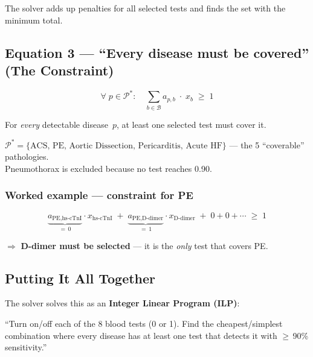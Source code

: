 \documentclass[11pt,a4paper]{article}
\begin{document}
The solver adds up penalties for all selected tests and finds the set with the
minimum total.


\subsection{Equation 3 --- ``Every disease must be covered'' (The Constraint)}

\begin{equation}
\forall\; p \in \mathcal{P}^{*} :\quad
\sum_{b \in \mathcal{B}} a_{p,b} \;\cdot\; x_b \;\geq\; 1
\tag{Coverage}
\end{equation}

\begin{tcolorbox}[insightbox, title={Plain English}]
For \emph{every} detectable disease~$p$, at least one selected test must cover it.
\end{tcolorbox}

$\mathcal{P}^{*} = \{\text{ACS, PE, Aortic Dissection, Pericarditis, Acute HF}\}$
--- the 5 ``coverable'' pathologies.\\
Pneumothorax is excluded because no test reaches 0.90.

\subsubsection*{Worked example --- constraint for PE}

\[
\underbrace{a_{\text{PE,hs-cTnI}}}_{=\,0}\!\cdot x_{\text{hs-cTnI}}
\;+\;
\underbrace{a_{\text{PE,D-dimer}}}_{=\,1}\!\cdot x_{\text{D-dimer}}
\;+\; 0 + 0 + \cdots \;\geq\; 1
\]

$\Rightarrow$ \textbf{D-dimer must be selected} --- it is the \emph{only} test
that covers PE.


\subsection{Putting It All Together}

The solver solves this as an \textbf{Integer Linear Program (ILP)}:

\begin{tcolorbox}[insightbox, title={One-line summary}]
``Turn on/off each of the 8 blood tests (0 or 1). Find the
cheapest/simplest combination where every disease has at least one
test that detects it with $\geq$\,90\% sensitivity.''
\end{tcolorbox}
\end{document}
